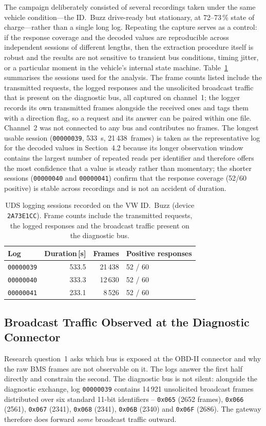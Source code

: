 \documentclass[11pt,a4paper,oneside,parskip=half]{scrreprt}
\providecommand{\hex}{}\renewcommand{\hex}[1]{\texttt{0x#1}}
\begin{document}
The campaign deliberately consisted of several recordings taken under the same vehicle condition---the ID.~Buzz drive-ready but stationary, at 72--73\,\% state of charge---rather than a single long log. Repeating the capture serves as a control: if the response coverage and the decoded values are reproducible across independent sessions of different lengths, then the extraction procedure itself is robust and the results are not sensitive to transient bus conditions, timing jitter, or a particular moment in the vehicle's internal state machine. Table~\ref{tab:uds_logs} summarises the sessions used for the analysis. The frame counts listed include the transmitted requests, the logged responses and the unsolicited broadcast traffic that is present on the diagnostic bus, all captured on channel~1; the logger records its own transmitted frames alongside the received ones and tags them with a direction flag, so a request and its answer can be paired within one file. Channel~2 was not connected to any bus and contributes no frames. The longest usable session (\texttt{00000039}, 533~s, 21\,438~frames) is taken as the representative log for the decoded values in Section~4.2 because its longer observation window contains the largest number of repeated reads per identifier and therefore offers the most confidence that a value is steady rather than momentary; the shorter sessions (\texttt{00000040} and \texttt{00000041}) confirm that the response coverage (52/60 positive) is stable across recordings and is not an accident of duration.

\begin{table}[H]
\caption{UDS logging sessions recorded on the VW ID.~Buzz (device \texttt{2A73E1CC}). Frame counts include the transmitted requests, the logged responses and the broadcast traffic present on the diagnostic bus.}
\label{tab:uds_logs}
\centering
\begin{tabular}{lrrl}
\toprule
\textbf{Log} & \textbf{Duration\,[s]} & \textbf{Frames} & \textbf{Positive responses} \\
\midrule
\texttt{00000039} & 533.5 & 21\,438 & 52 / 60 \\
\texttt{00000040} & 333.3 & 12\,630 & 52 / 60 \\
\texttt{00000041} & 233.1 &  8\,526 & 52 / 60 \\
\bottomrule
\end{tabular}
\end{table}

\subsection{Broadcast Traffic Observed at the Diagnostic Connector}
\label{ssec:broadcast}
Research question~1 asks which bus is exposed at the OBD-II connector and why the raw BMS frames are not observable on it. The logs answer the first half directly and constrain the second. The diagnostic bus is not silent: alongside the diagnostic exchange, log \texttt{00000039} contains 14\,921 unsolicited broadcast frames distributed over six standard 11-bit identifiers -- \hex{065} (2652 frames), \hex{066} (2561), \hex{067} (2341), \hex{068} (2341), \hex{06B} (2340) and \hex{06F} (2686). The gateway therefore does forward \emph{some} broadcast traffic outward.
\end{document}
